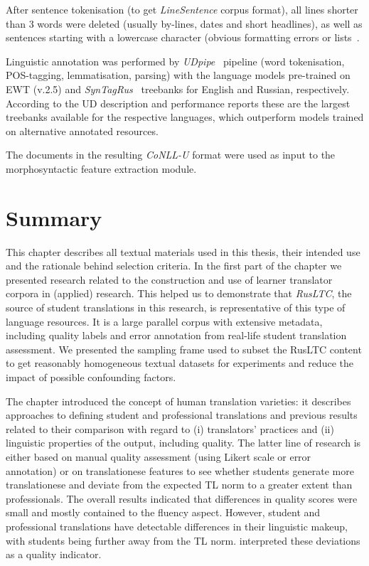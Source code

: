 After sentence tokenisation (to get \textit{LineSentence} corpus format), all lines shorter than 3 words were deleted (usually by-lines, dates and short headlines), as well as sentences starting with a lowercase character (obvious formatting errors or lists~\cite[see similar filtering rule in][]{Guzman2019}. 

Linguistic annotation was performed by \textit{UDpipe}~\cite[][v.1.2.0]{Straka2017}  pipeline (word tokenisation, POS-tagging, lemmatisation, parsing) with the language models pre-trained on \gls{EWT} (v.2.5) and \textit{SynTagRus}~\cite[v2.5,][]{Droganova2018} treebanks for English and Russian, respectively. According to the UD description and performance reports these are the largest treebanks available for the respective languages, which outperform models trained on alternative annotated resources.

The documents in the resulting \textit{CoNLL-U} format were used as input to the morphosyntactic feature extraction module. 
\section{\label{sec:sum3}Summary} 
This chapter describes all textual materials used in this thesis, their intended use and the rationale behind selection criteria.
In the first part of the chapter we presented research related to the construction and use of learner translator corpora in (applied) research. This helped us to demonstrate that \textit{RusLTC}, the source of student translations in this research, is representative of this type of language resources. It is a large parallel corpus with extensive metadata, including quality labels and error annotation from real-life student translation assessment. We presented the sampling frame used to subset the RusLTC content to get reasonably homogeneous textual datasets for experiments and reduce the impact of possible confounding factors. 

The chapter introduced the concept of human translation varieties: it describes approaches to defining student and professional translations and previous results related to their comparison with regard to (i) translators' practices and (ii) linguistic properties of the output, including quality. The latter line of research is either based on manual quality assessment (using Likert scale or error annotation) or on translationese features to see whether students generate more translationese and deviate from the expected TL norm to a greater extent than professionals. The overall results indicated that differences in quality scores were small and mostly contained to the fluency aspect. However, student and professional translations have detectable differences in their linguistic makeup, with students being further away from the TL norm. \citet{Sutter2017} interpreted these deviations as a quality indicator. 

